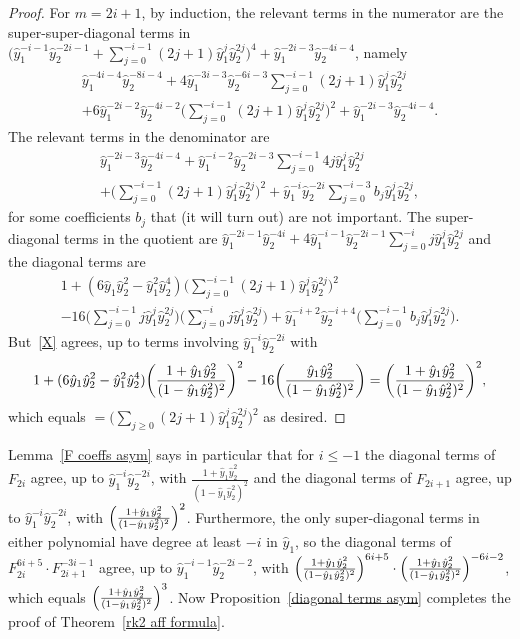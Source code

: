 \documentclass[10pt,a4paper]{amsart}
\theoremstyle{definition}
\newcommand{\hy}{\hat{y}}
\begin{document}
\begin{proof}
For $m=2i+1$, by induction, the relevant terms in the numerator are the super-super-diagonal terms in $\bigl(\hy_1^{-i-1}\hy_2^{-2i-1}+\sum_{j=0}^{-i-1}(2j+1)\hy_1^j\hy_2^{2j}\bigr)^4+\hy_1^{-2i-3}\hy_2^{-4i-4}$, namely
\begin{multline}\label{odd numer}
\hy_1^{-4i-4}\hy_2^{-8i-4}+4\hy_1^{-3i-3}\hy_2^{-6i-3}\sum_{j=0}^{-i-1}(2j+1)\hy_1^j\hy_2^{2j}\\
+6\hy_1^{-2i-2}\hy_2^{-4i-2}\biggl(\sum_{j=0}^{-i-1}(2j+1)\hy_1^j\hy_2^{2j}\biggr)^2
+\hy_1^{-2i-3}\hy_2^{-4i-4}.
\end{multline}
The relevant terms in the denominator are
\begin{multline}\label{odd denom}
\hy_1^{-2i-3}\hy_2^{-4i-4}+\hy_1^{-i-2}\hy_2^{-2i-3}\sum_{j=0}^{-i-1}4j\hy_1^j\hy_2^{2j}\\
+\biggl(\sum_{j=0}^{-i-1}(2j+1)\hy_1^j\hy_2^{2j}\biggr)^2+\hy_1^{-i}\hy_2^{-2i}\sum_{j=0}^{-i-3}b_j\hy_1^j\hy_2^{2j},
\end{multline}
for some coefficients $b_j$ that (it will turn out) are not important.
The super-diagonal terms in the quotient are $\hy_1^{-2i-1}\hy_2^{-4i}+4\hy_1^{-i-1}\hy_2^{-2i-1}\sum_{j=0}^{-i}j\hy_1^j\hy_2^{2j}$ and the diagonal terms are
\begin{multline}\label{X}
1+(6\hy_1\hy_2^2-\hy_1^2\hy_2^4)\biggl(\sum_{j=0}^{-i-1}(2j+1)\hy_1^j\hy_2^{2j}\biggr)^2\\-16\biggl(\sum_{j=0}^{-i-1}j\hy_1^j\hy_2^{2j}\biggr)\biggl(\sum_{j=0}^{-i}j\hy_1^j\hy_2^{2j}\biggr)+\hy_1^{-i+2}\hy_2^{-i+4}\biggl(\sum_{j=0}^{-i-1}b_j\hy_1^j\hy_2^{2j}\biggr).
\end{multline}
But~\eqref{X} agrees, up to terms involving $\hy_1^{-i}\hy_2^{-2i}$ with 
\begin{equation}\label{X FPS}
1+(6\hy_1\hy_2^2-\hy_1^2\hy_2^4)\biggl(\frac{1+\hy_1\hy_2^2}{(1-\hy_1\hy_2^2)^2}\biggr)^2\\-16\biggl(\frac{\hy_1\hy_2^2}{(1-\hy_1\hy_2^2)^2}\biggr)=\biggl(\frac{1+\hy_1\hy_2^2}{(1-\hy_1\hy_2^2)^2}\biggr)^2,
\end{equation}
which equals $=\bigl(\sum_{j\ge0}(2j+1)\hy_1^j\hy_2^{2j}\bigr)^2$ as desired.
\end{proof}

Lemma~\ref{F coeffs asym} says in particular that for $i\le-1$ the diagonal terms of $F_{2i}$ agree, up to $\hy_1^{-i}\hy_2^{-2i}$, with $\frac{1+\hy_1\hy_2^2}{(1-\hy_1\hy_2^2)^2}$ and the diagonal terms of $F_{2i+1}$ agree, up to $\hy_1^{-i}\hy_2^{-2i}$, with $\Bigl(\frac{1+\hy_1\hy_2^2}{(1-\hy_1\hy_2^2)^2}\Bigr)^2$.
Furthermore, the only super-diagonal terms in either polynomial have degree at least $-i$ in $\hy_1$, so the diagonal terms of $F_{2i}^{6i+5}\cdot F_{2i+1}^{-3i-1}$ agree, up to $\hy_1^{-i-1}\hy_2^{-2i-2}$, with $\Bigl(\frac{1+\hy_1\hy_2^2}{(1-\hy_1\hy_2^2)^2}\Bigr)^{6i+5}\cdot\Bigl(\frac{1+\hy_1\hy_2^2}{(1-\hy_1\hy_2^2)^2}\Bigr)^{-6i-2}$, which equals $\Bigl(\frac{1+\hy_1\hy_2^2}{(1-\hy_1\hy_2^2)^2}\Bigr)^3$.
Now Proposition~\ref{diagonal terms asym} completes the proof of Theorem~\ref{rk2 aff formula}.
\end{document}
